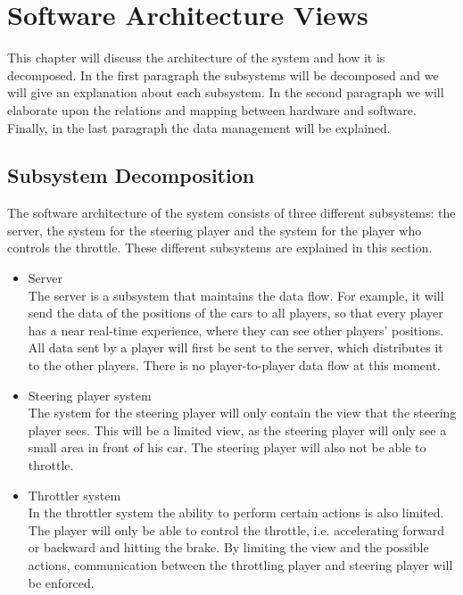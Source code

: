 \documentclass[11pt,twoside,a4paper]{article}
\begin{document}
\newpage

\section{Software Architecture Views}
This chapter will discuss the architecture of the system and how it is decomposed. In the first paragraph the subsystems will be decomposed and we will give an explanation about each subsystem. In the second paragraph we will elaborate upon the relations and mapping between hardware and software. Finally, in the last paragraph the data management will be explained.


\subsection{Subsystem Decomposition}
The software architecture of the system consists of three different subsystems: the server, the system for the steering player and the system for the player who controls the throttle. These different subsystems are explained in this section.

\begin{itemize}
\item Server \hfill \\
    The server is a subsystem that maintains the data flow. For example, it will send the data of the positions of the cars to all players, so that every player has a near real-time experience, where they can see other players' positions. All data sent by a player will first be sent to the server, which distributes it to the other players. There is no player-to-player data flow at this moment.
\item Steering player system \hfill \\
    The system for the steering player will only contain the view that the steering player sees. This will be a limited view, as the steering player will only see a small area in front of his car. The steering player will also not be able to throttle. 
\item Throttler system \hfill \\
    In the throttler system the ability to perform certain actions is also limited. The player will only be able to control the throttle, i.e. accelerating forward or backward and hitting the brake. By limiting the view and the possible actions, communication between the throttling player and steering player will be enforced.
\end{itemize}
\end{document}
